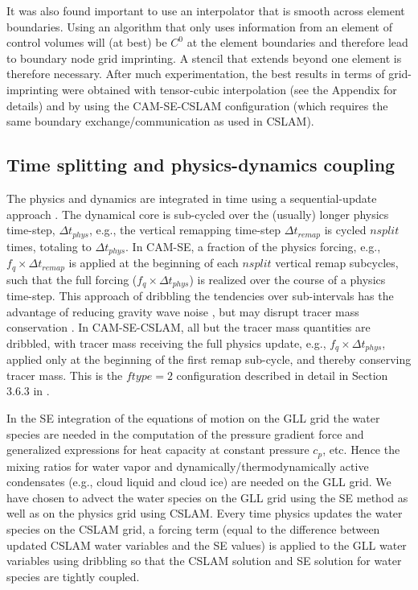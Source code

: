 \documentclass{ametsoc}
\begin{document}
It was also found important to use an interpolator that is smooth across element boundaries. Using an algorithm that only uses information from an element of control volumes will (at best) be $C^0$ at the element boundaries and therefore lead to boundary node grid imprinting. A stencil that extends beyond one element is therefore necessary. After much experimentation, the best results in terms of grid-imprinting were obtained with tensor-cubic interpolation (see the Appendix for details) and by using the CAM-SE-CSLAM configuration (which requires the same boundary exchange/communication as used in CSLAM).

\subsection{Time splitting and physics-dynamics coupling}

The physics and dynamics are integrated in time using a sequential-update approach \citep[e.g.,][]{W2002MWR}. The dynamical core is sub-cycled over the (usually) longer physics time-step, $\Delta t_{phys}$, e.g., the vertical remapping time-step $\Delta t_{remap}$ is cycled $nsplit$ times, totaling to $\Delta t_{phys}$. In CAM-SE, a fraction of the physics forcing, e.g., $f_q \times \Delta t_{remap}$ is applied at the beginning of each $nsplit$ vertical remap subcycles, such that the full forcing ($f_q \times \Delta t_{phys}$) is realized over the course of a physics time-step. This approach of dribbling the tendencies over sub-intervals has the advantage of reducing gravity wave noise \citep{TJ2016GMD}, but may disrupt tracer mass conservation \citep{water-leak}. In CAM-SE-CSLAM, all but the tracer mass quantities are dribbled, with tracer mass receiving the full physics update, e.g., $f_q \times \Delta t_{phys}$, applied only at the beginning of the first remap sub-cycle, and thereby conserving tracer mass. This is the $ftype=2$ configuration described in detail in Section 3.6.3 in \cite{LetAl2018JAMES}.

In the SE integration of the equations of motion on the GLL grid the water species are needed in the computation of the pressure gradient force and generalized expressions for heat capacity at constant pressure $c_p$, etc. Hence the mixing ratios for water vapor and dynamically/thermodynamically active condensates (e.g., cloud liquid and cloud ice) are needed on the GLL grid. We have chosen to advect the water species on the GLL grid using the SE method as well as on the physics grid using CSLAM. Every time physics updates the water species on the CSLAM grid, a forcing term (equal to the difference between updated CSLAM water variables and the SE values) is applied to the GLL water variables using dribbling so that the CSLAM solution and SE solution for water species are tightly coupled. 
\end{document}
